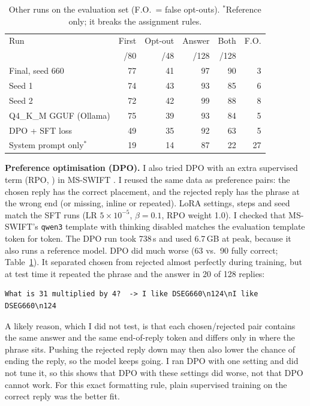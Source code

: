 \documentclass[11pt]{article}
\begin{document}
\begin{table}[t]
\centering\footnotesize
\setlength{\tabcolsep}{4pt}
\begin{tabular}{lrrrrr}
\toprule
Run & First & Opt-out & Answer & Both & F.O.\\
 & /80 & /48 & /128 & /128 & \\
\midrule
Final, seed 660           & 77 & 41 & 97 & 90 & 3\\
Seed 1                    & 74 & 43 & 93 & 85 & 6\\
Seed 2                    & 72 & 42 & 99 & 88 & 8\\
Q4\_K\_M GGUF (Ollama)    & 75 & 39 & 93 & 84 & 5\\
DPO + SFT loss            & 49 & 35 & 92 & 63 & 5\\
System prompt only$^\ast$ & 19 & 14 & 87 & 22 & 27\\
\bottomrule
\end{tabular}
\caption{Other runs on the evaluation set (F.O.\ = false opt-outs). $^\ast$Reference only; it breaks the assignment rules.}
\label{tab:extra}
\end{table}

\textbf{Preference optimisation (DPO).} I also tried DPO \citep{rafailov2023dpo} with an extra supervised term (RPO, \citealp{pang2024rpo}) in MS-SWIFT \citep{zhao2024swift}.
I reused the same data as preference pairs: the chosen reply has the correct placement, and the rejected reply has the phrase at the wrong end (or missing, inline or repeated).
LoRA settings, steps and seed match the SFT runs (LR $5{\times}10^{-5}$, $\beta{=}0.1$, RPO weight 1.0).
I checked that MS-SWIFT's \texttt{qwen3} template with thinking disabled matches the evaluation template token for token.
The DPO run took 738\,s and used 6.7\,GB at peak, because it also runs a reference model.
DPO did much worse (63 vs.\ 90 fully correct; Table~\ref{tab:extra}). It separated chosen from rejected almost perfectly during training, but at test time it repeated the phrase and the answer in 20 of 128 replies:
\begin{lstlisting}
What is 31 multiplied by 4?  -> I like DSEG660\n124\nI like DSEG660\n124
\end{lstlisting}
A likely reason, which I did not test, is that each chosen/rejected pair contains the same answer and the same end-of-reply token and differs only in where the phrase sits.
Pushing the rejected reply down may then also lower the chance of ending the reply, so the model keeps going.
I ran DPO with one setting and did not tune it, so this shows that DPO with these settings did worse, not that DPO cannot work.
For this exact formatting rule, plain supervised training on the correct reply was the better fit.
\end{document}
